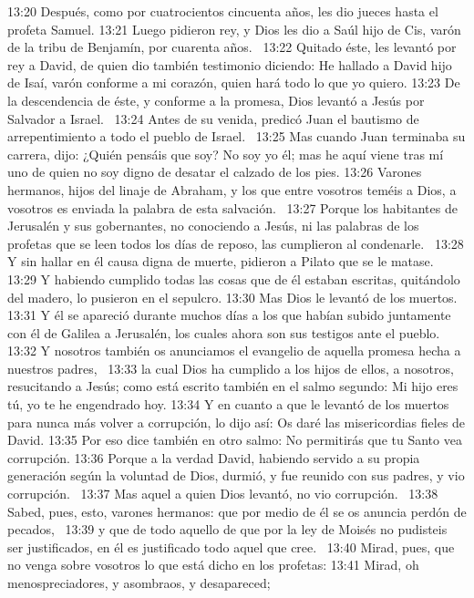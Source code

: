 13:20 Después, como por cuatrocientos cincuenta años, les dio jueces hasta el profeta Samuel. 
13:21 Luego pidieron rey, y Dios les dio a Saúl hijo de Cis, varón de la tribu de Benjamín, por cuarenta años.  
13:22 Quitado éste, les levantó por rey a David, de quien dio también testimonio diciendo: He hallado a David hijo de Isaí, varón conforme a mi corazón, quien hará todo lo que yo quiero. 
13:23 De la descendencia de éste, y conforme a la promesa, Dios levantó a Jesús por Salvador a Israel.  
13:24 Antes de su venida, predicó Juan el bautismo de arrepentimiento a todo el pueblo de Israel.  
13:25 Mas cuando Juan terminaba su carrera, dijo: ¿Quién pensáis que soy? No soy yo él; mas he aquí viene tras mí uno de quien no soy digno de desatar el calzado de los pies. 
13:26 Varones hermanos, hijos del linaje de Abraham, y los que entre vosotros teméis a Dios, a vosotros es enviada la palabra de esta salvación.  
13:27 Porque los habitantes de Jerusalén y sus gobernantes, no conociendo a Jesús, ni las palabras de los profetas que se leen todos los días de reposo, las cumplieron al condenarle.  
13:28 Y sin hallar en él causa digna de muerte, pidieron a Pilato que se le matase. 
13:29 Y habiendo cumplido todas las cosas que de él estaban escritas, quitándolo del madero, lo pusieron en el sepulcro. 
13:30 Mas Dios le levantó de los muertos.  
13:31 Y él se apareció durante muchos días a los que habían subido juntamente con él de Galilea a Jerusalén, los cuales ahora son sus testigos ante el pueblo.  
13:32 Y nosotros también os anunciamos el evangelio de aquella promesa hecha a nuestros padres,  
13:33 la cual Dios ha cumplido a los hijos de ellos, a nosotros, resucitando a Jesús; como está escrito también en el salmo segundo: Mi hijo eres tú, yo te he engendrado hoy. 
13:34 Y en cuanto a que le levantó de los muertos para nunca más volver a corrupción, lo dijo así: Os daré las misericordias fieles de David. 
13:35 Por eso dice también en otro salmo: No permitirás que tu Santo vea corrupción. 
13:36 Porque a la verdad David, habiendo servido a su propia generación según la voluntad de Dios, durmió, y fue reunido con sus padres, y vio corrupción.  
13:37 Mas aquel a quien Dios levantó, no vio corrupción.  
13:38 Sabed, pues, esto, varones hermanos: que por medio de él se os anuncia perdón de pecados,  
13:39 y que de todo aquello de que por la ley de Moisés no pudisteis ser justificados, en él es justificado todo aquel que cree.  
13:40 Mirad, pues, que no venga sobre vosotros lo que está dicho en los profetas: 
13:41 Mirad, oh menospreciadores, y asombraos, y desapareced;  
